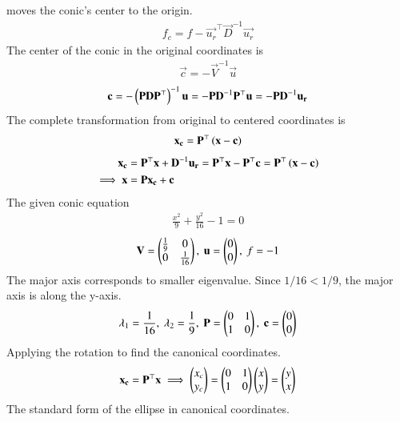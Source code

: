 \documentclass[journal]{IEEEtran}
\begin{document}
	moves the conic's center to the origin.
	\begin{align}
		f_c = f - \vec{u_r}^\top\vec{D}^{-1}\vec{u_r}
	\end{align}
	The center of the conic in the original coordinates is 
	\begin{align}
		\vec{c} = -\vec{V}^{-1}\vec{u}
	\end{align}
	\begin{align}
		\mathbf{c} = -\left(\mathbf{P}\mathbf{D}\mathbf{P}^\top\right)^{-1}\mathbf{u} = -\mathbf{P}\mathbf{D}^{-1}\mathbf{P}^\top\mathbf{u} = -\mathbf{P}\mathbf{D}^{-1}\mathbf{u_r}
	\end{align}
	The complete transformation from original to centered coordinates is 
	\begin{align}
		\mathbf{x_c} = \mathbf{P}^\top\left(\mathbf{x}-\mathbf{c}\right)
	\end{align}
	\begin{align}
		\mathbf{x_c} &= \mathbf{P}^\top\mathbf{x} + \mathbf{D}^{-1}\mathbf{u_r} = \mathbf{P}^\top\mathbf{x} - \mathbf{P}^\top\mathbf{c} = \mathbf{P}^\top\left(\mathbf{x}-\mathbf{c}\right) \\
		\implies \mathbf{x} &= \mathbf{P}\mathbf{x_c} + \mathbf{c} \label{eq:71}
	\end{align}
	The given conic equation
	\begin{align}
		\frac{x^2}{9} + \frac{y^2}{16} - 1 = 0
	\end{align}
	\begin{align}
		\mathbf{V} = \begin{pmatrix}\frac{1}{9} & 0 \\ 0 & \frac{1}{16}\end{pmatrix}, \text{ } \mathbf{u} = \begin{pmatrix}0 \\ 0\end{pmatrix}, \text{ } f = -1
	\end{align}
	The major axis corresponds to smaller eigenvalue. Since $1/16 < 1/9$, the major axis is along the y-axis.
	\begin{align}
		\lambda_1 = \frac{1}{16}, \text{ } \lambda_2 = \frac{1}{9}, \text{ } \mathbf{P} = \begin{pmatrix}0 & 1 \\ 1 & 0\end{pmatrix}, \text{ } \mathbf{c} = \begin{pmatrix}0 \\ 0\end{pmatrix}
	\end{align}
	Applying the rotation to find the canonical coordinates.
	\begin{align}
		\mathbf{x_c} = \mathbf{P}^\top\mathbf{x} \implies \begin{pmatrix}x_c \\ y_c\end{pmatrix} = \begin{pmatrix}0 & 1 \\ 1 & 0\end{pmatrix}\begin{pmatrix}x \\ y\end{pmatrix} = \begin{pmatrix}y \\ x\end{pmatrix}
	\end{align}
	The standard form of the ellipse in canonical coordinates.
\end{document}
